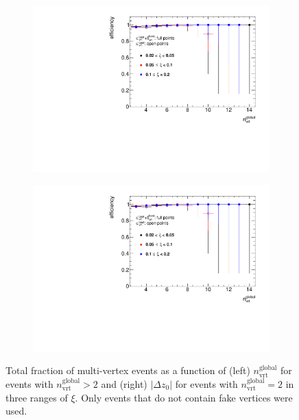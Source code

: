 \begin{figure}[h!]
	\centering
	\begin{subfigure}{.47\textwidth}
		\includegraphics[width=\textwidth,page=2]{chapters/chrgSTAR/img/vertex/vertexEffi_ksi_noFake.pdf}
	\end{subfigure}
	\begin{subfigure}{.47\textwidth}
		\includegraphics[width=\textwidth,page=9]{chapters/chrgSTAR/img/vertex/vertexEffi_ksi_noFake.pdf}
	\end{subfigure}
	\caption{Total fraction of multi-vertex events as a function of (left) $n_\textrm{vrt}^\textrm{global}$ for events with $n^\textrm{global}_\textrm{vrt}>2$ and (right) $|\Delta z_0|$ for events with $n^\textrm{global}_\textrm{vrt}=2$  in three ranges of $\xi$. Only events that do not contain fake vertices were used. }
	\label{fig:vertexVetoDZ_noFake}
\end{figure}

